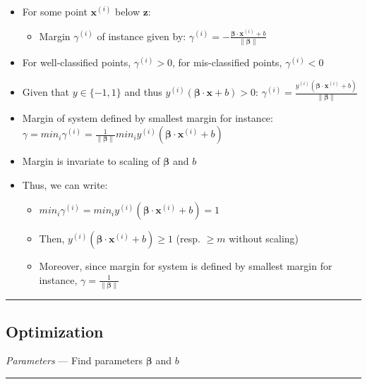 \begin{itemize}
\begin{itemize}
    \end{itemize}
    \item For some point $\boldsymbol{x}^{(i)}$ below $\boldsymbol{z}$:
    \begin{itemize}
        \item Margin $\gamma^{(i)}$ of instance given by: $\gamma^{(i)} = - \frac{ \boldsymbol{\beta} \cdot \boldsymbol{x}^{(i)} + b }{\| \boldsymbol{\beta} \|}$
    \end{itemize}
    \item For well-classified points, $\gamma^{(i)} > 0$, for mis-classified points, $\gamma^{(i)} < 0$
    \item Given that $y \in \{-1,1\}$ and thus $y^{(i)} (\boldsymbol{\beta} \cdot \boldsymbol{x} + b) > 0$:
    $\gamma^{(i)} = \frac{ y^{(i)} (\boldsymbol{\beta} \cdot \boldsymbol{x}^{(i)} + b) }{\| \boldsymbol{\beta} \|}$
    \item Margin of system defined by smallest margin for instance: $\gamma = min_i \gamma^{(i)} = \frac{1}{\| \boldsymbol{\beta} \|} min_i y^{(i)} (\boldsymbol{\beta} \cdot \boldsymbol{x}^{(i)} + b)$
    \item Margin is invariate to scaling of $\boldsymbol{\beta}$ and $b$
    \item Thus, we can write:
    \begin{itemize}
        \item $min_i \gamma^{(i)} = min_i y^{(i)} (\boldsymbol{\beta} \cdot \boldsymbol{x}^{(i)} + b) = 1$
        \item Then, $y^{(i)} (\boldsymbol{\beta} \cdot \boldsymbol{x}^{(i)} + b) \geq 1$ (resp. $\geq m$ without scaling)
        \item Moreover, since margin for system is defined by smallest margin for instance, $\gamma = \frac{1}{\| \boldsymbol{\beta} \|} $
    \end{itemize}
\end{itemize}

{\color{black}\hrule height 0.001mm}

\subsection*{Optimization}
\emph{Parameters} --- Find parameters $\boldsymbol{\beta}$ and $b$

{\color{lightgray}\hrule height 0.001mm}

